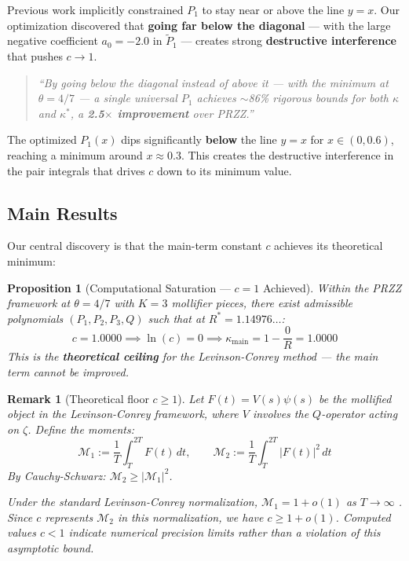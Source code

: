 \documentclass[11pt]{article}
\newtheorem{proposition}{Proposition}
\newtheorem{remark}{Remark}
\begin{document}
Previous work implicitly constrained $P_1$ to stay near or above the line $y = x$. Our optimization discovered that \textbf{going far below the diagonal} --- with the large negative coefficient $a_0 = -2.0$ in $\tilde{P}_1$ --- creates strong \textbf{destructive interference} that pushes $c \to 1$.

\begin{quotation}
\textit{``By going below the diagonal instead of above it --- with the minimum at $\theta = 4/7$ --- a single universal $P_1$ achieves $\sim$86\% rigorous bounds for both $\kappa$ and $\kappa^*$, a \textbf{2.5$\times$ improvement} over PRZZ.''}
\end{quotation}

The optimized $P_1(x)$ dips significantly \textbf{below} the line $y = x$ for $x \in (0, 0.6)$, reaching a minimum around $x \approx 0.3$. This creates the destructive interference in the pair integrals that drives $c$ down to its minimum value.

\subsection{Main Results}

Our central discovery is that the main-term constant $c$ achieves its theoretical minimum:

\begin{proposition}[Computational Saturation --- $c = 1$ Achieved]
\label{prop:saturation}
Within the PRZZ framework at $\theta = 4/7$ with $K = 3$ mollifier pieces,
there exist admissible polynomials $(P_1, P_2, P_3, Q)$ such that at $R^* = 1.14976\ldots$:
\begin{equation}
\boxed{c = 1.0000 \implies \ln(c) = 0 \implies \kappa_{\text{main}} = 1 - \frac{0}{R} = 1.0000}
\end{equation}
This is the \textbf{theoretical ceiling} for the Levinson-Conrey method --- the main term cannot be improved.
\end{proposition}

\begin{remark}[Theoretical floor $c \geq 1$]
\label{rem:c-floor}
Let $F(t) = V(s)\psi(s)$ be the mollified object in the Levinson-Conrey framework, where $V$ involves the $Q$-operator acting on $\zeta$. Define the moments:
\[
\mathcal{M}_1 := \frac{1}{T}\int_T^{2T} F(t)\, dt, \qquad
\mathcal{M}_2 := \frac{1}{T}\int_T^{2T} |F(t)|^2\, dt
\]
By Cauchy-Schwarz: $\mathcal{M}_2 \geq |\mathcal{M}_1|^2$.

Under the standard Levinson-Conrey normalization, $\mathcal{M}_1 = 1 + o(1)$ as $T \to \infty$ \cite{PRZZ2019, Conrey1989}. Since $c$ represents $\mathcal{M}_2$ in this normalization, we have $c \geq 1 + o(1)$. Computed values $c < 1$ indicate numerical precision limits rather than a violation of this asymptotic bound.
\end{remark}
\end{document}
